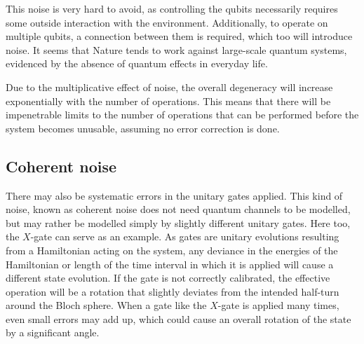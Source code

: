 This noise is very hard to avoid, as controlling the qubits necessarily requires some outside interaction with the environment.
Additionally, to operate on multiple qubits, a connection between them is required, which too will introduce noise.
It seems that Nature tends to work against large-scale quantum systems, evidenced by the absence of quantum effects in everyday life.

Due to the multiplicative effect of noise, the overall degeneracy will increase exponentially with the number of operations.
This means that there will be impenetrable limits to the number of operations that can be performed before the system becomes unusable, assuming no error correction is done.

\subsection{Coherent noise}
There may also be systematic errors in the unitary gates applied.
This kind of noise, known as coherent noise does not need quantum channels to be modelled, but may rather be modelled simply by slightly different unitary gates.
Here too, the $X$-gate can serve as an example.
As gates are unitary evolutions resulting from a Hamiltonian acting on the system, any deviance in the energies of the Hamiltonian or length of the time interval in which it is applied will cause a different state evolution.
If the gate is not correctly calibrated, the effective operation will be a rotation that slightly deviates from the intended half-turn around the Bloch sphere.
When a gate like the $X$-gate is applied many times, even small errors may add up, which could cause an overall rotation of the state by a significant angle.

